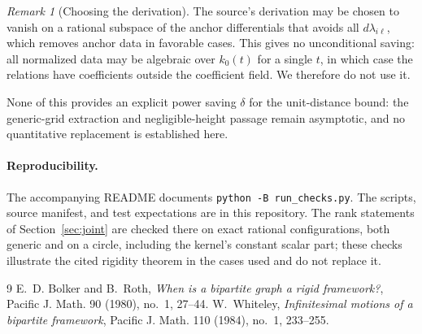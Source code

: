 \documentclass[11pt]{article}
\theoremstyle{remark}
\newtheorem{remark}{Remark}
\begin{document}
\begin{remark}[Choosing the derivation]
The source's derivation may be chosen to vanish on a rational subspace
of the anchor differentials that avoids all $d\lambda_{i\ell}$, which
removes anchor data in favorable cases. This gives no unconditional
saving: all normalized data may be algebraic over $k_0(t)$ for a
single $t$, in which case the relations have coefficients outside the
coefficient field. We therefore do not use it.
\end{remark}

None of this provides an explicit power saving $\delta$ for the
unit-distance bound: the generic-grid extraction and negligible-height
passage remain asymptotic, and no quantitative replacement is
established here.

\paragraph{Reproducibility.}
The accompanying README documents \texttt{python -B run\_checks.py}.
The scripts, source manifest, and test expectations are in this repository.
The rank statements of Section~\ref{sec:joint} are checked there on
exact rational configurations, both generic and on a circle, including
the kernel's constant scalar part; these checks illustrate the cited
rigidity theorem in the cases used and do not replace it.

\begin{thebibliography}{9}
E.~D. Bolker and B.~Roth, \emph{When is a bipartite graph a rigid
framework?}, Pacific J. Math. 90 (1980), no.~1, 27--44.
W.~Whiteley, \emph{Infinitesimal motions of a bipartite framework},
Pacific J. Math. 110 (1984), no.~1, 233--255.
\end{thebibliography}
\end{document}
